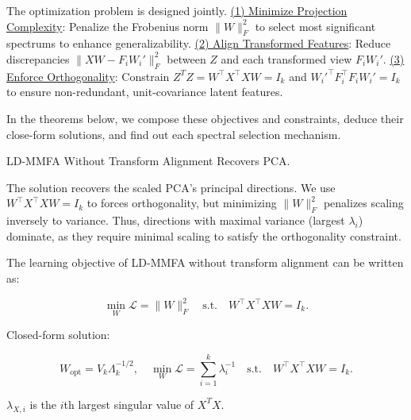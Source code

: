 The optimization problem is designed jointly.
\underline{(1) Minimize Projection Complexity}: Penalize the Frobenius norm \( \|W\|_F^2 \) to select most significant spectrums to enhance generalizability.  
\underline{(2) Align Transformed Features}: Reduce discrepancies \( \|XW - F_i W_i'\|_F^2 \) between \( Z \) and each transformed view \( F_i W_i' \).  
\underline{(3) Enforce Orthogonality}: Constrain \( Z^TZ= W^\top X^\top X W = I_k \) and \( W_i'^\top F_i^\top F_i W_i' = I_k \) to ensure non-redundant, unit-covariance latent features.  

In the theorems below, we compose these objectives and constraints, deduce their close-form solutions, and find out each spectral selection mechanism.


    
\begin{lemma}\label{lem:PCA}LD-MMFA Without Transform Alignment Recovers PCA.

The solution recovers the scaled PCA’s principal directions. We use \( W^\top X^\top X W = I_k \) to forces orthogonality, but minimizing \( \|W\|_F^2 \) penalizes scaling inversely to variance. Thus, directions with maximal variance (largest \( \lambda_i \)) dominate, as they require minimal scaling to satisfy the orthogonality constraint.

The learning objective of LD-MMFA without transform alignment can be written as:

\begin{equation}
    \min_{W} \mathcal{L} = \|W\|_F^2 \quad \text{s.t.} \quad W^\top X^\top X W = I_k.
\end{equation}

Closed-form solution:  

\begin{equation}    
    W_{\text{opt}} = V_k \Lambda_k^{-1/2}, \quad \min_{W} \mathcal{L} = \sum_{i = 1}^k \lambda_{i}^{-1} \quad \text{s.t.} \quad W^\top X^\top X W = I_k.
\end{equation}

$\lambda_{X,i}$ is the $i$th largest singular value of $X^TX$.


\end{lemma}


